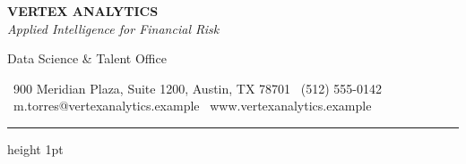 \documentclass[11pt]{letter}
\begin{document}
\begin{tcolorbox}[
  enhanced,
  colback=navy,
  colframe=navy,
  boxrule=0pt,
  sharp corners,
  left=16pt,right=16pt,top=11pt,bottom=11pt
]
\begin{minipage}[c]{0.68\textwidth}
{\color{white}\Large\textbf{VERTEX ANALYTICS}}\\[2pt]
{\color{gold}\footnotesize\itshape Applied Intelligence for Financial Risk}
\end{minipage}\hfill
\begin{minipage}[c]{0.28\textwidth}
\raggedleft\footnotesize\color{white}
Data Science \& Talent Office
\end{minipage}
\end{tcolorbox}

\vspace{4pt}
\begin{center}
\footnotesize\color{slate}
\faMapMarker\ 900 Meridian Plaza, Suite 1200, Austin, TX 78701
\quad\textbar\quad \faPhone\ (512) 555-0142
\quad\textbar\quad \faEnvelope\ m.torres@vertexanalytics.example
\quad\textbar\quad \faGlobe\ www.vertexanalytics.example
\end{center}
\vspace{2pt}
{\color{gold}\hrule height 1pt}
\vspace{14pt}
\end{document}
